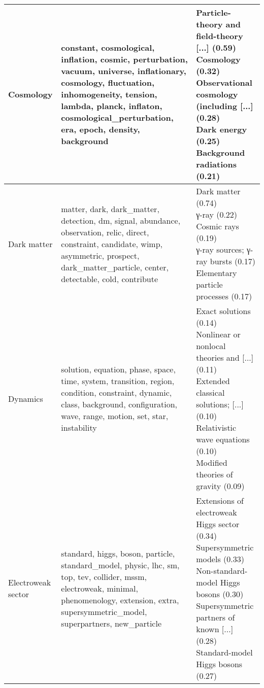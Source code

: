 \begin{longtable}{p{}|b{}|b{}}
                     Cosmology &                           constant, cosmological, inflation, cosmic, perturbation, vacuum, universe, inflationary, cosmology, fluctuation, inhomogeneity, tension, lambda, planck, inflaton, cosmological\_perturbation, era, epoch, density, background &                                                                 \shortstack[l]{Particle-theory and field-theory [...] (0.59)\\ Cosmology (0.32)\\ Observational cosmology (including [...] (0.28)\\ Dark energy (0.25)\\ Background radiations (0.21)}\\ \hline
                   Dark matter &                                                matter, dark, dark\_matter, detection, dm, signal, abundance, observation, relic, direct, constraint, candidate, wimp, asymmetric, prospect, dark\_matter\_particle, center, detectable, cold, contribute &                                                                                                     \shortstack[l]{Dark matter (0.74)\\ γ-ray (0.22)\\ Cosmic rays (0.19)\\ γ-ray sources; γ-ray bursts (0.17)\\ Elementary particle processes (0.17)}\\ \hline
                      Dynamics &                                                                        solution, equation, phase, space, time, system, transition, region, condition, constraint, dynamic, class, background, configuration, wave, range, motion, set, star, instability &                                       \shortstack[l]{Exact solutions (0.14)\\ Nonlinear or nonlocal theories and [...] (0.11)\\ Extended classical solutions; [...] (0.10)\\ Relativistic wave equations (0.10)\\ Modified theories of gravity (0.09)}\\ \hline
            Electroweak sector &                                                 standard, higgs, boson, particle, standard\_model, physic, lhc, sm, top, tev, collider, mssm, electroweak, minimal, phenomenology, extension, extra, supersymmetric\_model, superpartners, new\_particle &                             \shortstack[l]{Extensions of electroweak Higgs sector (0.34)\\ Supersymmetric models (0.33)\\ Non-standard-model Higgs bosons (0.30)\\ Supersymmetric partners of known [...] (0.28)\\ Standard-model Higgs bosons (0.27)}\\ \hline

\end{longtable}
